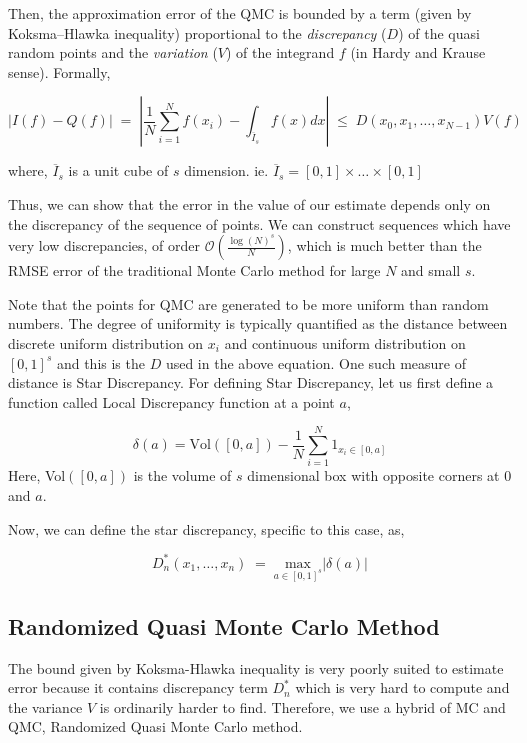 \documentclass[12pt,letterpaper, twoside]{article}
\theoremstyle{definition}
\begin{document}
Then, the approximation error of the QMC is bounded by a term (given by Koksma–Hlawka inequality) proportional to the \textit{discrepancy} ($D$) of the quasi random points and the \textit{variation} ($V$) of the integrand $f$ (in Hardy and Krause sense). Formally,

\begin{equation*}
    |I(f) - Q(f)| \;=\;  |\frac{1}{N}\sum_{i=1}^{N}f(x_i) - \int_{\overline{I}_s}f(x)dx| \; \leq \; D(x_0, x_1, \dots, x_{N-1})V(f) 
\end{equation*}

where, $\overline{I}_s$ is a unit cube of $s$ dimension. ie. $\overline{I}_s = [0,1] \times \dots \times [0,1]$

Thus, we can show that the error in the value of our estimate depends only on the discrepancy of the sequence of points. We can construct sequences which have very low discrepancies, of order $\mathcal{O}(\frac{\log(N)^s}{N})$, which is much better than the RMSE error of the traditional Monte Carlo method for large $N$ and small $s$.

Note that the points for QMC are generated to be more uniform than random  numbers. The degree of uniformity is typically quantified as the distance between discrete uniform distribution on $x_i$ and continuous uniform distribution on $[0,1]^{s}$ and this is the $D$ used in the above equation. One such measure of distance is Star Discrepancy. For defining Star Discrepancy, let us first define a function called Local Discrepancy function at a point $a$,

\begin{equation*}
    \delta(a) = \text{Vol}([0,a]) - \frac{1}{N}\sum_{i=1}^{N} 1_{x_i \in [0,a]}
\end{equation*}
Here, Vol$([0,a])$ is the volume of $s$ dimensional box with opposite corners at $0$ and $a$.

Now, we can define the star discrepancy, specific to this case, as,

\begin{equation*}
    D_n^*(x_1, \dots, x_n) \;=\; \underset{a\in[0,1]^s}{\text{max}}|\delta(a)|
\end{equation*}


\subsection{Randomized Quasi Monte Carlo Method}
The bound given by Koksma-Hlawka inequality is very poorly suited to estimate error because it contains discrepancy term $D_n^*$ which is very hard to compute and the variance $V$ is ordinarily harder to find. Therefore, we use a hybrid of MC and QMC, Randomized Quasi Monte Carlo method.
\end{document}

